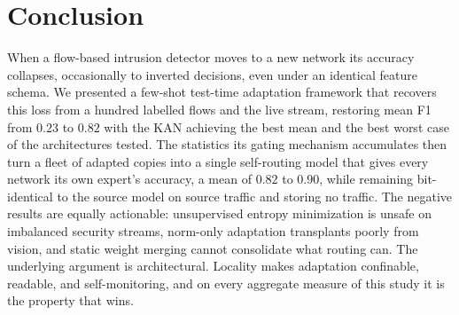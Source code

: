 \documentclass[10pt, conference, letterpaper]{IEEEtran}
\begin{document}
\section{Conclusion}\label{sec:conclusion}
When a flow-based intrusion detector moves to a new network its
accuracy collapses, occasionally to inverted decisions, even under an
identical feature schema. We presented a few-shot test-time adaptation
framework that recovers this loss from a hundred labelled flows and
the live stream, restoring mean F1 from $0.23$ to $0.82$ with the KAN
achieving the best mean and the best worst case of the architectures
tested. The statistics its gating mechanism accumulates then turn a
fleet of adapted copies into a single self-routing model that gives
every network its own expert's accuracy, a mean of $0.82$ to $0.90$,
while remaining bit-identical to the source model on source traffic
and storing no traffic. The negative results are equally actionable:
unsupervised entropy minimization is unsafe on imbalanced security
streams, norm-only adaptation transplants poorly from vision, and
static weight merging cannot consolidate what routing can. The
underlying argument is architectural. Locality makes adaptation
confinable, readable, and self-monitoring, and on every aggregate
measure of this study it is the property that wins.



\end{document}
